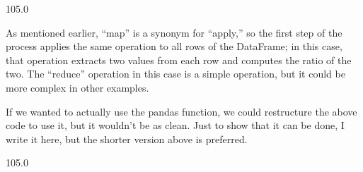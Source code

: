 \documentclass[letterpaper,10pt,english]{jupyterBook}
\begin{document}
\begin{sphinxVerbatim}[commandchars=\\\{\}]
 \PYG{p}{[}\PYG{p}{]}  \PYG{p}{[}\PYG{p}{]} 
\end{sphinxVerbatim}

\begin{sphinxVerbatim}[commandchars=\\\{\}]
105.0
\end{sphinxVerbatim}

\sphinxAtStartPar
As mentioned earlier, “map” is a synonym for “apply,” so the first step of the process applies the same operation to all rows of the DataFrame; in this case, that operation extracts two values from each row and computes the ratio of the two.  The “reduce” operation in this case is a simple  operation, but it could be more complex in other examples.

\sphinxAtStartPar
If we wanted to actually use the pandas  function, we could restructure the above code to use it, but it wouldn’t be as clean.  Just to show that it can be done, I write it here, but the shorter version above is preferred.

\begin{sphinxVerbatim}[commandchars=\\\{\}]
    \PYG{p}{[}\PYG{p}{]}  \PYG{p}{[}\PYG{p}{]}
   
\end{sphinxVerbatim}

\begin{sphinxVerbatim}[commandchars=\\\{\}]
105.0
\end{sphinxVerbatim}
\end{document}
